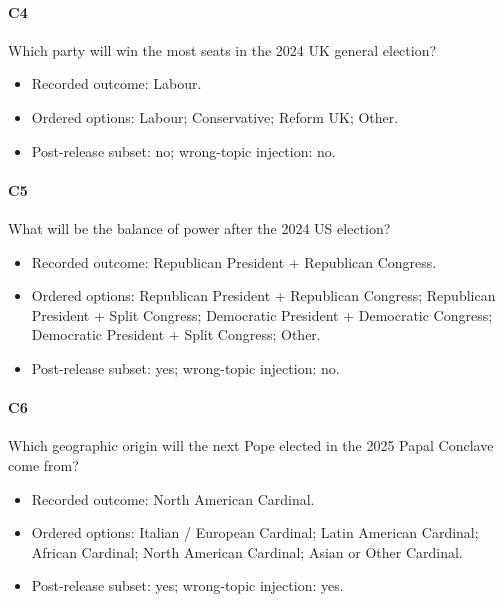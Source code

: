 \paragraph*{C4} Which party will win the most seats in the 2024 UK general election?

\begin{itemize}

\item Recorded outcome: Labour.

\item Ordered options: Labour; Conservative; Reform UK; Other.

\item Post-release subset: no; wrong-topic injection: no.

\end{itemize}

\paragraph*{C5} What will be the balance of power after the 2024 US election?

\begin{itemize}

\item Recorded outcome: Republican President + Republican Congress.

\item Ordered options: Republican President + Republican Congress; Republican President + Split Congress; Democratic President + Democratic Congress; Democratic President + Split Congress; Other.

\item Post-release subset: yes; wrong-topic injection: no.

\end{itemize}

\paragraph*{C6} Which geographic origin will the next Pope elected in the 2025 Papal Conclave come from?

\begin{itemize}

\item Recorded outcome: North American Cardinal.

\item Ordered options: Italian / European Cardinal; Latin American Cardinal; African Cardinal; North American Cardinal; Asian or Other Cardinal.

\item Post-release subset: yes; wrong-topic injection: yes.

\end{itemize}

